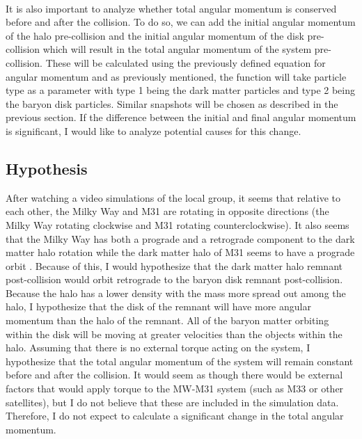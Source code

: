 \documentclass[linenumbers,trackchanges]{aastex7}
\begin{document}
\paragraph{} It is also important to analyze whether total angular momentum is conserved before and after the collision. To do so, we can add the initial angular momentum of the halo pre-collision and the initial angular momentum of the disk pre-collision which will result in the total angular momentum of the system pre-collision. These will be calculated using the previously defined equation for angular momentum and as previously mentioned, the function will take particle type as a parameter with type 1 being the dark matter particles and type 2 being the baryon disk particles. Similar snapshots will be chosen as described in the previous section. If the difference between the initial and final angular momentum is significant, I would like to analyze potential causes for this change.

\subsection{Hypothesis} After watching a video simulations of the local group, it seems that relative to each other, the Milky Way and M31 are rotating in opposite directions (the Milky Way rotating clockwise and M31 rotating counterclockwise). It also seems that the Milky Way has both a prograde and a retrograde component to the dark matter halo rotation while the dark matter halo of M31 seems to have a prograde orbit \citep{Deason+2011}. Because of this, I would hypothesize that the dark matter halo remnant post-collision would orbit retrograde to the baryon disk remnant post-collision. Because the halo has a lower density with the mass more spread out among the halo, I hypothesize that the disk of the remnant will have more angular momentum than the halo of the remnant. All of the baryon matter orbiting within the disk will be moving at greater velocities than the objects within the halo. Assuming that there is no external torque acting on the system, I hypothesize that the total angular momentum of the system will remain constant before and after the collision. It would seem as though there would be external factors that would apply torque to the MW-M31 system (such as M33 or other satellites), but I do not believe that these are included in the simulation data. Therefore, I do not expect to calculate a significant change in the total angular momentum.

{}

\end{document}
